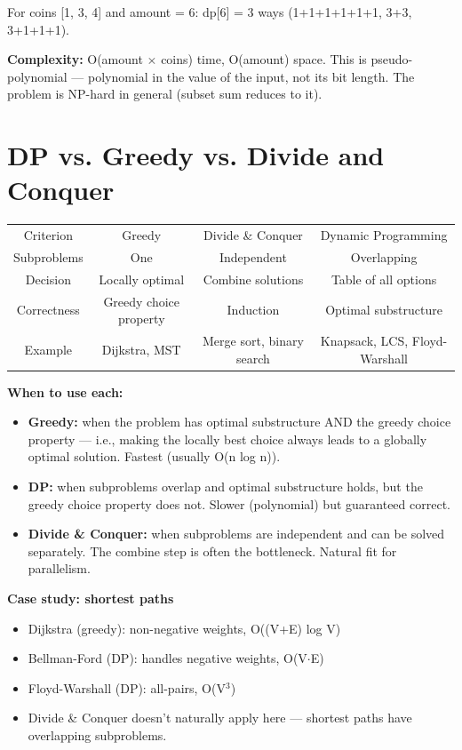 For coins [1, 3, 4] and amount = 6: dp[6] = 3 ways (1+1+1+1+1+1, 3+3, 3+1+1+1).

\textbf{Complexity:} O(amount $\times$ coins) time, O(amount) space. This is pseudo-polynomial — polynomial in the value of the input, not its bit length. The problem is NP-hard in general (subset sum reduces to it).

\section{DP vs. Greedy vs. Divide and Conquer}

\begin{center}
\begin{tabular}{cccc}
\toprule
Criterion & Greedy & Divide \& Conquer & Dynamic Programming \\
Subproblems & One & Independent & Overlapping \\
Decision & Locally optimal & Combine solutions & Table of all options \\
Correctness & Greedy choice property & Induction & Optimal substructure \\
Example & Dijkstra, MST & Merge sort, binary search & Knapsack, LCS, Floyd-Warshall \\

\bottomrule
\end{tabular}
\end{center}

\textbf{When to use each:}

\begin{itemize}
\item \textbf{Greedy:} when the problem has optimal substructure AND the greedy choice property — i.e., making the locally best choice always leads to a globally optimal solution. Fastest (usually O(n log n)).
\item \textbf{DP:} when subproblems overlap and optimal substructure holds, but the greedy choice property does not. Slower (polynomial) but guaranteed correct.
\item \textbf{Divide \& Conquer:} when subproblems are independent and can be solved separately. The combine step is often the bottleneck. Natural fit for parallelism.
\end{itemize}

\textbf{Case study: shortest paths}
\begin{itemize}
\item Dijkstra (greedy): non-negative weights, O((V+E) log V)
\item Bellman-Ford (DP): handles negative weights, O(V$\cdot$E)
\item Floyd-Warshall (DP): all-pairs, O(V$^{3}$)
\item Divide \& Conquer doesn't naturally apply here — shortest paths have overlapping subproblems.
\end{itemize}

